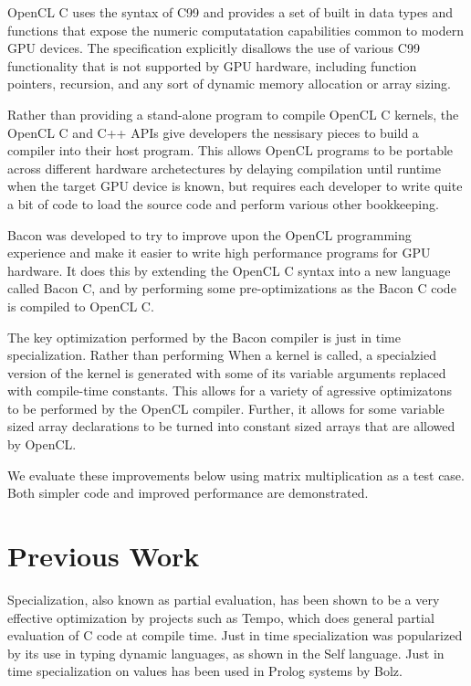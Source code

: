 \documentclass{llncs}
\begin{document}
OpenCL C uses the syntax of C99 and provides a set of built in data
types and functions that expose the numeric computatation capabilities
common to modern GPU devices. The specification explicitly disallows
the use of various C99 functionality that is not supported by GPU
hardware, including function pointers, recursion, and any sort of
dynamic memory allocation or array sizing. 

Rather than providing a stand-alone program to compile OpenCL C
kernels, the OpenCL C and C++ APIs give developers the nessisary
pieces to build a compiler into their host program. This allows OpenCL
programs to be portable across different hardware archetectures by
delaying compilation until runtime when the target GPU device is
known, but requires each developer to write quite a bit of code to
load the source code and perform various other bookkeeping.

Bacon was developed to try to improve upon the OpenCL programming
experience and make it easier to write high performance programs for
GPU hardware. It does this by extending the OpenCL C syntax into a new
language called Bacon C, and by performing some pre-optimizations as
the Bacon C code is compiled to OpenCL C.

The key optimization performed by the Bacon compiler is just in time
specialization. Rather than performing When a kernel is called, a
specialzied version of the kernel is generated with some of its
variable arguments replaced with compile-time constants. This allows
for a variety of agressive optimizatons to be performed by the OpenCL
compiler. Further, it allows for some variable sized array
declarations to be turned into constant sized arrays that are allowed
by OpenCL.

We evaluate these improvements below using matrix multiplication as a
test case. Both simpler code and improved performance are
demonstrated.

\section{Previous Work}

Specialization, also known as partial evaluation, has been shown to be
a very effective optimization by projects such as
Tempo\cite{consel:1998}, which does general partial evaluation of C
code at compile time. Just in time specialization was popularized by
its use in typing dynamic languages, as shown in the Self
language\cite{chambers:1992}. Just in time specialization on values has
been used in Prolog systems by Bolz\cite{bolz:2010}.
\end{document}
